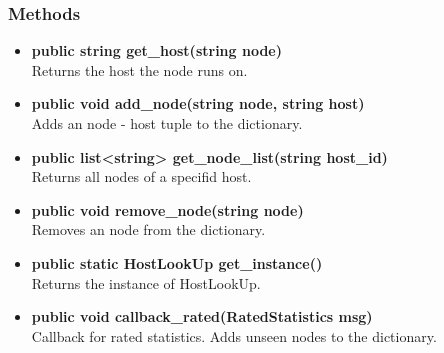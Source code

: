 \subsubsection{Methods}
\begin{itemize}
	\item \textbf{ public string get\_host(string node) }\\
		Returns the host the node runs on.
	\item \textbf{ public void add\_node(string node, string host) }\\
		Adds an node - host tuple to the dictionary.
	\item \textbf{ public list<string> get\_node\_list(string host\_id) }\\
		Returns all nodes of a specifid host.
	\item \textbf{ public void remove\_node(string node) }\\
		Removes an node from the dictionary.
	\item \textbf{ public static HostLookUp get\_instance() }\\
		Returns the instance of HostLookUp.
	\item \textbf{ public void callback\_rated(RatedStatistics msg)}\\
		Callback for rated statistics. Adds unseen nodes to the dictionary.
\end{itemize}